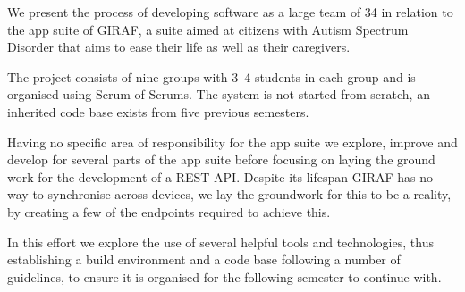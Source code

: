 We present the process of developing software as a large team of 34 in relation to the app suite of GIRAF, a suite aimed at citizens with Autism Spectrum Disorder that aims to ease their life as well as their caregivers.

\bigskip
The project consists of nine groups with 3--4 students in each group and is organised using Scrum of Scrums.
The system is not started from scratch, an inherited code base exists from five previous semesters.

\bigskip
Having no specific area of responsibility for the app suite we explore, improve and develop for several parts of the app suite before focusing on laying the ground work for the development of a REST API.
Despite its lifespan GIRAF has no way to synchronise across devices, we lay the groundwork for this to be a reality, by creating a few of the endpoints required to achieve this.

\bigskip
In this effort we explore the use of several helpful tools and technologies, thus establishing a build environment and a code base following a number of guidelines, to ensure it is organised for the following semester to continue with.
